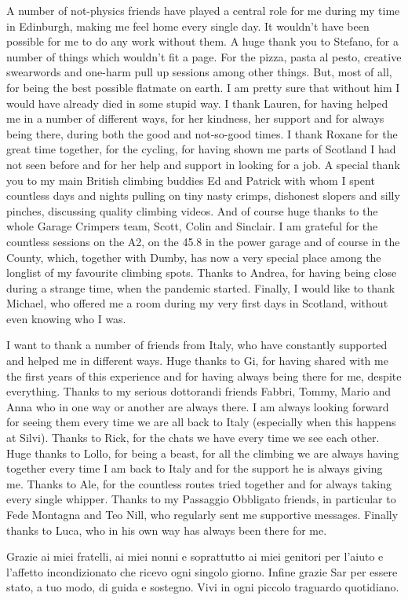 A number of not-physics friends have played a central role for me during my time in Edinburgh,
making me feel home every single day. It wouldn't have been possible for me to do any work without them.
% 
A huge thank you to Stefano, for a number of things which wouldn't fit a page. For the pizza, pasta al pesto,
creative swearwords and one-harm pull up sessions among other things. 
But, most of all, for being the best possible flatmate on earth.
I am pretty sure that without him I would have already died in some stupid way. 
%
I thank Lauren, for having helped me in a number of different ways, for her kindness, her support and for always being there,
during both the good and not-so-good times.  
I thank Roxane for the great time together, for the cycling, for having shown me parts of Scotland 
I had not seen before and for her help and support in looking for a job. 
%
A special thank you to my main British climbing buddies Ed and Patrick with whom I spent countless days and nights
pulling on tiny nasty crimps, dishonest slopers and silly pinches, discussing quality climbing videos.
And of course huge thanks to the whole Garage Crimpers team,
Scott, Colin and Sinclair. I am grateful for the countless sessions on the A2, on the 45.8 in the power garage 
and of course in the County, which, together with Dumby, has now a very special place among the longlist of my
favourite climbing spots. 
%
Thanks to Andrea, for having being close during a strange time, when the pandemic started.
Finally, I would like to thank Michael, who offered me a room during my very first days in Scotland, without even knowing 
who I was.

%   
I want to thank a number of friends from Italy, who have constantly supported and helped me in different ways.
Huge thanks to Gi, for having shared with me the first years of this experience and for having always being there for me,
despite everything.
Thanks to my serious dottorandi friends Fabbri, Tommy, Mario and Anna who in one way or another are always there.
I am always looking forward for seeing them every time we are all back to Italy (especially when this happens at Silvi). 
Thanks to Rick, for the chats we have every time we see each other.
Huge thanks to Lollo, for being a beast, for all the climbing we are always having together every time
I am back to Italy and for the support he is always giving me.
Thanks to Ale, for the countless routes tried together and for always taking every single whipper.
Thanks to my Passaggio Obbligato friends, in particular to Fede Montagna and Teo Nill, who 
regularly sent me supportive messages. 
Finally thanks to Luca, who in his own way has always been there for me.

Grazie ai miei fratelli, ai miei nonni e soprattutto ai miei genitori per l'aiuto e l'affetto incondizionato
che ricevo ogni singolo giorno. 
Infine grazie Sar per essere stato, a tuo modo, di guida e sostegno. Vivi in ogni piccolo traguardo quotidiano.

\blankpage
 



